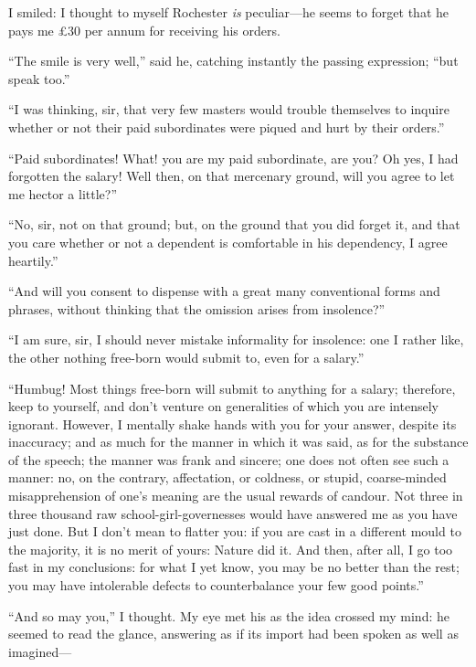 I smiled: I thought to myself \Mr{} Rochester \emph{is} peculiar---he
seems to forget that he pays me £30 per annum for receiving his orders.

\enquote{The smile is very well,} said he, catching instantly the
passing expression; \enquote{but speak too.}

\enquote{I was thinking, sir, that very few masters would trouble
	themselves to inquire whether or not their paid subordinates were piqued
	and hurt by their orders.}

\enquote{Paid subordinates! What! you are my paid subordinate, are
	you? Oh yes, I had forgotten the salary! Well then, on that mercenary
	ground, will you agree to let me hector a little?}

\enquote{No, sir, not on that ground; but, on the ground that you did
	forget it, and that you care whether or not a dependent is comfortable
	in his dependency, I agree heartily.}

\enquote{And will you consent to dispense with a great many conventional
	forms and phrases, without thinking that the omission arises from
	insolence?}

\enquote{I am sure, sir, I should never mistake informality for
	insolence: one I rather like, the other nothing free-born would submit
	to, even for a salary.}

\enquote{Humbug! Most things free-born will submit to anything for a
	salary; therefore, keep to yourself, and don't venture on generalities
	of which you are intensely ignorant. However, I mentally shake hands
	with you for your answer, despite its inaccuracy; and as much for the
	manner in which it was said, as for the substance of the speech; the
	manner was frank and sincere; one does not often see such a manner: no,
	on the contrary, affectation, or coldness, or stupid, coarse-minded
	misapprehension of one's meaning are the usual rewards of candour. Not
	three in three thousand raw school-girl-governesses would have answered
	me as you have just done. But I don't mean to flatter you: if you are
	cast in a different mould to the majority, it is no merit of yours:
	Nature did it. And then, after all, I go too fast in my conclusions:
	for what I yet know, you may be no better than the rest; you may have
	intolerable defects to counterbalance your few good points.}

\enquote{And so may you,} I thought. My eye met his as the idea crossed
my mind: he seemed to read the glance, answering as if its import had
been spoken as well as imagined---

